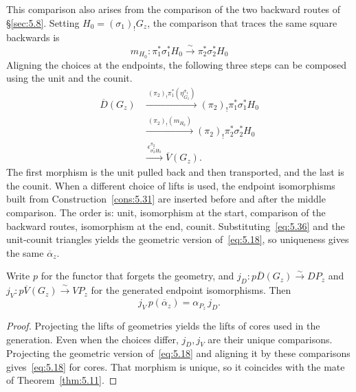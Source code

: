 \begin{construction}
This comparison also arises from the comparison of the two backward routes of
\S\ref{sec:5.8}. Setting $H_0=(\sigma_1)_!G_z$, the comparison that
traces the same square backwards is
\[
m_{H_0}:\pi_1^*\sigma_1^*H_0
\xrightarrow{\sim}\pi_2^*\sigma_2^*H_0
\]
Aligning the choices at the endpoints, the following three steps can be composed using the
unit and the counit.
\[
\begin{aligned}
\overline D(G_z)
&\xrightarrow{\ (\pi_2)_!\pi_1^*(\eta^{\sigma_1}_{G_z})\ }
(\pi_2)_!\pi_1^*\sigma_1^*H_0\\
&\xrightarrow{\ (\pi_2)_!(m_{H_0})\ }
(\pi_2)_!\pi_2^*\sigma_2^*H_0\\
&\xrightarrow{\ \epsilon^{\pi_2}_{\sigma_2^*H_0}\ }
\overline V(G_z).
\end{aligned}
\]
The first morphism is the unit pulled back and then transported, and the last is the
counit. When a different choice of lifts is used, the endpoint isomorphisms built from
Construction~\ref{cons:5.31} are inserted before and after the middle comparison. The order
is: unit, isomorphism at the start, comparison of the backward routes, isomorphism at the
end, counit. Substituting~\eqref{eq:5.36} and the unit-counit triangles yields the
geometric version of~\eqref{eq:5.18}, so uniqueness gives the same $\overline\alpha_z$.

\end{construction}

\begin{proposition}\label{prop:5.38}

Write $p$ for the functor that forgets the geometry, and
$j_D:p\overline D(G_z)\xrightarrow{\sim}DP_z$ and
$j_V:p\overline V(G_z)\xrightarrow{\sim}VP_z$ for the generated endpoint isomorphisms.
Then
\begin{equation*}
j_V\,p(\overline\alpha_z)=\alpha_{P_z}\,j_D.
\tag{5.44}\label{eq:5.44}
\end{equation*}

\end{proposition}

\begin{proof}

Projecting the lifts of geometries yields the lifts of cores used in the generation. Even
when the choices differ, $j_D,j_V$ are their unique comparisons. Projecting the geometric
version of~\eqref{eq:5.18} and aligning it by these comparisons gives~\eqref{eq:5.18} for
cores. That morphism is unique, so it coincides with the mate of Theorem~\ref{thm:5.11}.

\end{proof}

